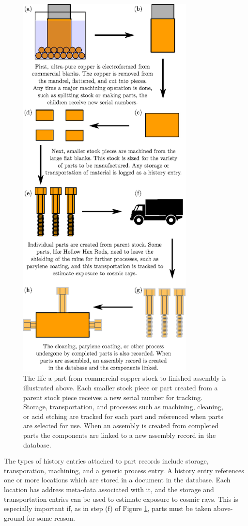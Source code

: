 \documentclass[journal]{IEEEtran}
\begin{document}
\begin{figure}[!t]
\centering
\includegraphics[width=3.5in]{example_part}
\caption{The life a part from commercial copper stock to finished assembly is illustrated above. Each smaller stock piece or part created from a
parent stock piece receives a new serial number for tracking.
Storage, transportation, and processes such as machining, cleaning, or acid etching are tracked for each part and
referenced when parts are selected for use. When an assembly is created from completed parts 
the components are linked to a new assembly record in the database.}
\label{example_part}
\end{figure}

The types of history entries attached to part records include storage, transporation, machining, and a generic process entry. 
A history entry references one or more locations which are stored in a document in the database. Each location has address meta-data
associated with it, and the storage and transportation entries can be used to estimate exposure to cosmic rays. This is especially 
important if, as in step (f) of Figure \ref{example_part}, parts must be taken above-ground for some reason.
\end{document}
